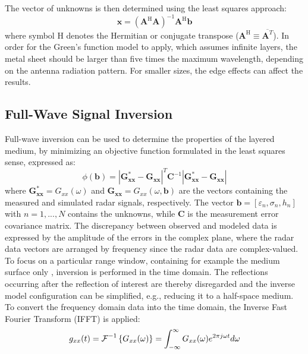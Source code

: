 The vector of unknowns is then determined using the least squares approach:
\begin{equation}
\mathbf{x}=\left(\mathbf{A}^{\text{H}}\mathbf{A}\right)^{-1}\mathbf{A}^{\text{H}}\mathbf{b}
\end{equation}
where symbol H denotes the Hermitian or conjugate transpose
($\mathbf{A}^{\text{H}}\equiv\overline{\mathbf{A}^{T}}$). In order for the Green's function model to apply, which assumes infinite layers, the metal sheet should be larger than five times the maximum wavelength, depending on the antenna radiation pattern. For smaller sizes, the edge effects can affect the results.

\subsection{Full-Wave Signal Inversion} \label{sec:radar-challenges:inversion}
Full-wave inversion can be used to determine the properties of the layered medium, by minimizing an objective function formulated in the least squares sense, expressed as:
\begin{equation}\label{OF}
\phi(\mathbf{b})=
\left|\mathbf{G^*_{xx}}-\mathbf{G_{xx}}\right|^T\mathbf{C}^{-1}
\left|\mathbf{G^*_{xx}}-\mathbf{G_{xx}}\right|
\end{equation}
where $\mathbf{G^*_{xx}}=G_{xx}(\omega)$ and $\mathbf{G_{xx}}=G_{xx}(\omega,\mathbf{b})$ are the vectors containing the measured and simulated radar signals, respectively. The vector $\mathbf{b}=[\varepsilon_n, \sigma_n, h_n]$ with $n=1,...,N$ contains the unknowns, while $\mathbf{C}$ is the measurement error covariance matrix. The discrepancy between observed and modeled data is expressed by the amplitude of the errors in the complex plane, where the radar data vectors are arranged by frequency since the radar data are complex-valued. To focus on a particular range window, containing for example the medium surface only \cite{Lambot:2006}, inversion is performed in the time domain. The reflections occurring after the reflection of interest are thereby disregarded and the inverse model configuration can be simplified, e.g., reducing it to a half-space medium. To convert the frequency domain data into the time domain, the Inverse Fast Fourier Transform (IFFT) is applied:
\begin{equation}
\label{eq:radar-challenges:ifft}
g_{xx}(t)=\text{$\cal{F}$}^{-1}\left\{
G_{xx}(\omega)
\right\}=\int_{-\infty}^{\infty}G_{xx}(\omega)e^{2\pi j \omega
t}d\omega
\end{equation}
